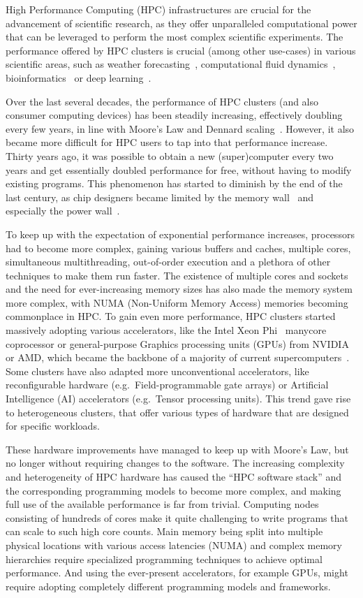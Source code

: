 High Performance Computing (HPC) infrastructures are crucial for the advancement of scientific
research, as they offer unparalleled computational power that can be leveraged to perform the most
complex scientific experiments. The performance offered by HPC clusters is crucial (among other
use-cases) in various scientific areas, such as weather forecasting~\cite{wrf},
computational fluid dynamics~\cite{cfd}, bioinformatics~\cite{bioinformatics} or deep
learning~\cite{hpcdl}.

Over the last several decades, the performance of HPC clusters (and also consumer computing
devices) has been steadily increasing, effectively doubling every few years, in line with Moore's
Law and Dennard scaling~\cite{mooreslaw}. However, it also became more difficult for HPC users
to tap into that performance increase. Thirty years ago, it was possible to obtain a new
(super)computer every two years and get essentially doubled performance for free, without having to
modify existing programs. This phenomenon has started to diminish by the end of the last century,
as chip designers became limited by the memory wall~\cite{memorywall} and especially the power
wall~\cite{powerwall}.

To keep up with the expectation of exponential performance increases, processors had to become more
complex, gaining various buffers and caches, multiple cores, simultaneous multithreading,
out-of-order execution and a plethora of other techniques to make them run faster. The existence of
multiple cores and sockets and the need for ever-increasing memory sizes has also made the memory
system more complex, with NUMA (Non-Uniform Memory Access) memories becoming commonplace in HPC. To
gain even more performance, HPC clusters started massively adopting various accelerators, like the
Intel Xeon Phi~\cite{xeonphi} manycore coprocessor or general-purpose Graphics processing
units (GPUs) from NVIDIA or AMD, which became the backbone of a majority of current
supercomputers~\cite{top500gpu}. Some clusters have also adapted more unconventional
accelerators, like reconfigurable hardware (e.g.\ Field-programmable gate arrays) or Artificial
Intelligence (AI) accelerators (e.g.\ Tensor processing units). This trend gave rise to
heterogeneous clusters, that offer various types of hardware that are designed for specific
workloads.

These hardware improvements have managed to keep up with Moore's Law, but no longer without
requiring changes to the software. The increasing complexity and heterogeneity of HPC hardware has
caused the ``HPC software stack'' and the corresponding programming models to become more complex,
and making full use of the available performance is far from trivial. Computing nodes consisting of
hundreds of cores make it quite challenging to write programs that can scale to such high core
counts. Main memory being split into multiple physical locations with various access latencies
(NUMA) and complex memory hierarchies require specialized programming techniques to achieve optimal
performance. And using the ever-present accelerators, for example GPUs, might require adopting
completely different programming models and frameworks.

